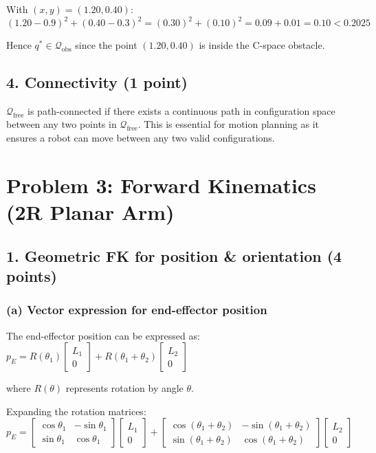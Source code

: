 \documentclass[11pt]{article}
\begin{document}
With $(x, y) = (1.20, 0.40)$:
$(1.20 - 0.9)^2 + (0.40 - 0.3)^2 = (0.30)^2 + (0.10)^2 = 0.09 + 0.01 = 0.10 < 0.2025$

Hence $q^* \in \mathcal{Q}_{\text{obs}}$ since the point $(1.20, 0.40)$ is inside the C-space obstacle.

\subsection*{4. Connectivity (1 point)}
$\mathcal{Q}_{\text{free}}$ is path-connected if there exists a continuous path in configuration space between any two points in $\mathcal{Q}_{\text{free}}$. This is essential for motion planning as it ensures a robot can move between any two valid configurations.

\section*{Problem 3: Forward Kinematics (2R Planar Arm)}

\subsection*{1. Geometric FK for position \& orientation (4 points)}
\subsubsection*{(a) Vector expression for end-effector position}
The end-effector position can be expressed as:
$p_E = R(\theta_1) \begin{bmatrix} L_1 \\ 0 \end{bmatrix} + R(\theta_1 + \theta_2) \begin{bmatrix} L_2 \\ 0 \end{bmatrix}$

where $R(\theta)$ represents rotation by angle $\theta$.

Expanding the rotation matrices:
$p_E = \begin{bmatrix} \cos\theta_1 & -\sin\theta_1 \\ \sin\theta_1 & \cos\theta_1 \end{bmatrix} \begin{bmatrix} L_1 \\ 0 \end{bmatrix} + \begin{bmatrix} \cos(\theta_1 + \theta_2) & -\sin(\theta_1 + \theta_2) \\ \sin(\theta_1 + \theta_2) & \cos(\theta_1 + \theta_2) \end{bmatrix} \begin{bmatrix} L_2 \\ 0 \end{bmatrix}$
\end{document}
